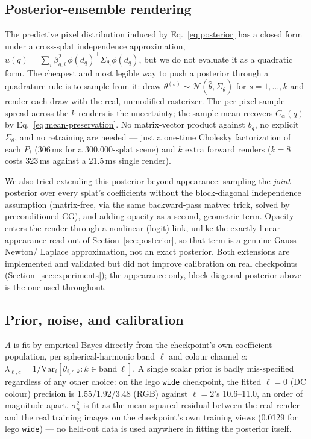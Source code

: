 \documentclass[letterpaper,10pt,conference]{ieeeconf}
\begin{document}
\subsection{Posterior-ensemble rendering}
\label{sec:ensemble}

The predictive pixel distribution induced by Eq.~\eqref{eq:posterior} has a
closed form under a cross-splat independence approximation,
$u(q)=\sum_i\beta_{q,i}^2\,\phi(d_q)^\top\Sigma_{\theta_i}\phi(d_q)$, but we
do not evaluate it as a quadratic form. The cheapest and most legible way
to push a posterior through a quadrature rule is to sample from it: draw
$\theta^{(s)}\sim\mathcal N(\hat\theta,\Sigma_\theta)$ for $s=1,\ldots,k$
and render each draw with the real, unmodified rasterizer. The per-pixel
sample spread across the $k$ renders is the uncertainty; the sample mean
recovers $C_\alpha(q)$ by Eq.~\eqref{eq:mean-preservation}. No
matrix-vector product against $b_q$, no explicit $\Sigma_\theta$, and no
retraining are needed --- just a one-time Cholesky factorization of each
$P_i$ (306\,ms for a 300{,}000-splat scene) and $k$ extra forward renders
($k=8$ costs 323\,ms against a 21.5\,ms single render).

We also tried extending this posterior beyond appearance: sampling the
\emph{joint} posterior over every splat's coefficients without the
block-diagonal independence assumption (matrix-free, via the same
backward-pass matvec trick, solved by preconditioned CG), and adding
opacity as a second, geometric term. Opacity enters the render through a
nonlinear (logit) link, unlike the exactly linear appearance read-out of
Section~\ref{sec:posterior}, so that term is a genuine Gauss--Newton/
Laplace approximation, not an exact posterior. Both extensions are
implemented and validated but did not improve calibration on real
checkpoints (Section~\ref{sec:experiments}); the appearance-only,
block-diagonal posterior above is the one used throughout.

\subsection{Prior, noise, and calibration}
\label{sec:kernel-choice}

$\Lambda$ is fit by empirical Bayes directly from the checkpoint's own
coefficient population, per spherical-harmonic band $\ell$ and colour
channel $c$: $\lambda_{\ell,c}=1/\mathrm{Var}_i[\theta_{i,c,k}: k\in
\mathrm{band}\ \ell]$. A single scalar prior is badly mis-specified
regardless of any other choice: on the lego \texttt{wide} checkpoint, the
fitted $\ell=0$ (DC colour) precision is 1.55/1.92/3.48 (RGB) against
$\ell=2$'s 10.6--11.0, an order of magnitude apart. $\sigma_n^2$ is fit as
the mean squared residual between the real render and the real training
images on the checkpoint's own training views (0.0129 for lego
\texttt{wide}) --- no held-out data is used anywhere in fitting the
posterior itself.
\end{document}
